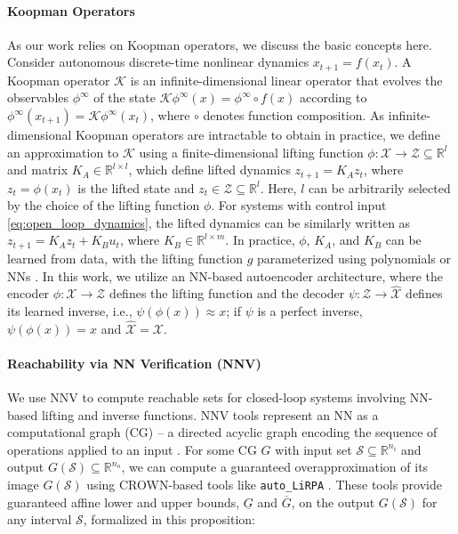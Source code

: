 \documentclass{l4dc2026}
\begin{document}
\paragraph{Koopman Operators} As our work relies on Koopman operators, we discuss the basic concepts here. Consider autonomous discrete-time nonlinear dynamics $x_{t+1} = f(x_t)$. A Koopman operator $\mathcal{K}$ is an infinite-dimensional linear operator that evolves the observables $\phi^\infty$ of the state $\mathcal{K} \phi^\infty(x) = \phi^\infty \circ f(x)$ according to $\phi^\infty(x_{t+1}) = \mathcal{K} \phi^\infty(x_t)$, where $\circ$ denotes function composition. As infinite-dimensional Koopman operators are intractable to obtain in practice, we define an approximation to $\mathcal{K}$ using a finite-dimensional lifting function $\phi: \mathcal{X} \rightarrow \mathcal{Z} \subseteq \mathbb{R}^{l}$ and matrix $K_{A} \in \mathbb{R}^{l \times l}$, which define lifted dynamics $z_{t+1} = K_{A} z_{t}$,  where $z_t = \phi(x_t)$ is the lifted state and $z_{t} \in \mathcal{Z} \subseteq \mathbb{R}^{l}$. Here, $l$ can be arbitrarily selected by the choice of the lifting function $\phi$. For systems with control input \eqref{eq:open_loop_dynamics}, the lifted dynamics can be similarly written as $z_{t+1} = K_{A} z_{t} + K_{B} u_t$, where $K_{B} \in \mathbb{R}^{l \times m}$. In practice, $\phi$, $K_A$, and $K_B$ can be learned from data, with the lifting function $g$ parameterized using polynomials or NNs \citep{koop_survey}. In this work, we utilize an NN-based autoencoder architecture, where the encoder $\phi: \mathcal{X} \rightarrow \mathcal{Z}$ defines the lifting function and the decoder $\psi: \mathcal{Z} \rightarrow \hat{\mathcal{X}}$ defines its learned inverse, i.e., $\psi(\phi(x)) \approx x$; if $\psi$ is a perfect inverse, $\psi(\phi(x)) = x$ and $\hat{\mathcal{X}} = \mathcal{X}$. 

\paragraph{Reachability via NN Verification (NNV)} We use NNV to compute reachable sets for closed-loop systems involving NN-based lifting and inverse functions. NNV tools represent an NN as a computational graph (CG) -- a directed acyclic graph encoding the sequence of operations applied to an input \citep{Rober2024CARV}. For some CG $G$ with input set $\mathcal{S} \subseteq \mathbb{R}^{n_i}$ and output $G(\mathcal{S}) \subseteq \mathbb{R}^{n_o}$, we can compute a guaranteed overapproximation of its image $G(\mathcal{S})$ using CROWN-based \citep{Zhang2018CROWN} tools like \texttt{auto\_LiRPA} \citep{Xu2020AutoLiRPA}. These tools provide guaranteed affine lower and upper bounds, $\underline{G}$ and $\overline{G}$, on the output $G(\mathcal{S})$ for any interval $\mathcal{S}$, formalized in this proposition:
\end{document}
